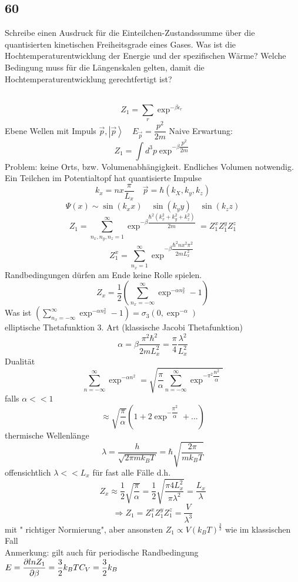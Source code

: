 \documentclass[12pt,a4paper]{report}
\newenvironment{myfrag}{\begin{it}}{\end{it}\vspace{3mm}\par}
\numberwithin{equation}{section}
\begin{document}
\subsection{60}
\begin{myfrag}
Schreibe einen Ausdruck für die Einteilchen-Zustandssumme über die
quantisierten kinetischen Freiheitsgrade eines Gases. Was ist die
Hochtemperaturentwicklung der Energie und der spezifischen Wärme?
Welche Bedingung muss für die Längenskalen gelten, damit die
Hochtemperaturentwicklung gerechtfertigt ist?
\end{myfrag} \quad \\
$$ Z_1 = \sum \limits _r \exp ^{-\beta \epsilon_r}$$
Ebene Wellen mit Impuls $\vec{p} ,\left| \vec{p} \right\rangle \quad E_{\vec{p}} = \dfrac{p^2}{2m}$
Naive Erwartung: $$ Z_1 = \int d^3 p \exp ^{-\beta \dfrac{p^2}{2m} } $$
Problem: keine Orts, bzw. Volumenabhängigkeit. Endliches Volumen notwendig. \\[1ex]
Ein Teilchen im Potentialtopf hat quantisierte Impulse
$$ k_x = n x \dfrac{\pi}{L_x} \quad \vec{p} = \hbar(k_X,k_y,k_z) $$
$$ \Psi(x) \sim \sin (k_x x) \quad \sin (k_y y) \quad \sin (k_z z)$$
$$ Z_1 = \sum \limits _{n_x,n_y,n_z=1}^\infty \exp ^{ -\beta \dfrac{\hbar ^2 ( k_x^2 + k_y ^2 + k_z ^2)}{2m}} = Z_1^x Z_1^y Z_1^z$$
$$ Z_1 ^x = \sum \limits _{n_x = 1} ^\infty \exp ^{-\beta \dfrac{\hbar ^2 n x^2 \pi^2}{2m L_x^2}}$$
Randbedingungen dürfen am Ende keine Rolle spielen.
$$ Z_x = \dfrac{1}{2} \left( \sum \limits _{n_x = - \infty } ^\infty \exp ^ { - \alpha n_x ^2} -1 \right)$$
Was ist \qquad $\left( \sum \limits _{n_x = - \infty } ^\infty \exp ^ { - \alpha n_x ^2} -1 \right) = \sigma _3 (0, \exp ^{- \alpha } ) $ \\ elliptische Thetafunktion 3. Art (klassische Jacobi Thetafunktion)
$$ \alpha = \beta \dfrac{\pi ^2 \hbar ^2}{2m L_x ^2} = \dfrac{\pi}{4} \dfrac{\lambda ^2}{L_x^2}$$
Dualität 
$$\sum \limits _{n = - \infty } ^\infty \exp ^ { - \alpha n^2} = \sqrt{\dfrac{\pi}{\alpha} \sum \limits _{n = - \infty } ^\infty \exp ^ { - \pi ^2 \dfrac{n^2}{\alpha}}}$$
falls $\alpha << 1$ 
$$ \approx \sqrt{\dfrac{\pi}{\alpha }} \left( 1+ 2 \exp ^{ -\dfrac{\pi ^2}{\alpha } } + ...\right) $$
thermische Wellenlänge
$$ \lambda = \dfrac{h}{\sqrt{2 \pi m k_B T}} = \hbar \sqrt{\dfrac{2\pi}{m k_B T}} $$
offensichtlich $ \lambda << L_x$ für fast alle Fälle d.h. 
$$Z_x \approx \dfrac{1}{2} \sqrt{\dfrac{\pi}{\alpha}} = \dfrac{1}{2} \sqrt{\dfrac{\pi 4 L_x^2}{\pi \lambda ^2}} = \dfrac{L_x}{\lambda }$$
$$ \Rightarrow Z_1 = Z_1^x Z_1^y Z_1^z = \dfrac{V}{\lambda ^3} $$ 
mit " richtiger Normierung", aber ansonsten $Z_1 \propto V(k_B T ) ^\frac{3}{2} $ wie im klassischen Fall \\
Anmerkung: gilt auch für periodische Randbedingung \\[1.5ex]
$ E = \dfrac{\partial ln Z_1}{\partial \beta} = \dfrac{3}{2} k_B T \\[1.5ex]
C_V = \dfrac{3}{2} k_B$
\end{document}
